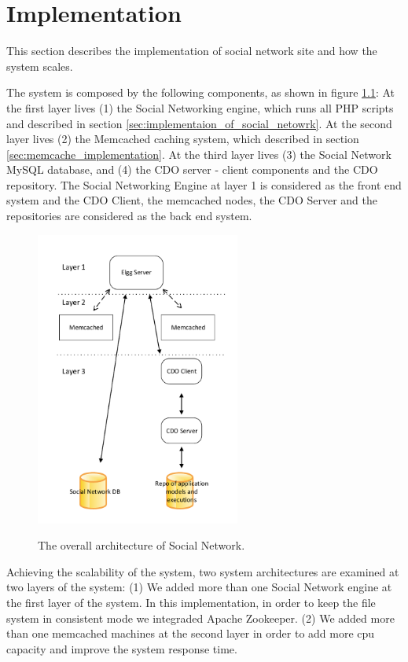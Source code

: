 
\chapter{Implementation}

This section describes the implementation of social network site
and how the system scales.

The system is composed by the following components, as shown in figure \ref{fig:system_architecture}: At the first layer lives (1) the Social Networking engine, which runs all PHP scripts and described in section \ref{sec:implementaion_of_social_netowrk}. At the second layer lives (2) the Memcached caching system, which described in section \ref{sec:memcache_implementation}. At the third layer lives (3) the Social Network MySQL database, and (4) the CDO server - client components and the CDO repository. The Social Networking Engine at layer 1 is considered as the front end system and the CDO Client, the memcached nodes, the CDO Server and the repositories are considered as the back end system. 

\begin{figure}[h]
	\caption{The overall architecture of Social Network.}
	\includegraphics[width=0.6\textwidth,natwidth=200,natheight=150]{./fig/system_architecture.pdf}
	\centering
	\label{fig:system_architecture}
\end{figure}

Achieving the scalability of the system, two system architectures are examined at two layers of the system: (1) We added more than one Social Network engine at the first layer of the system. In this implementation, in order to keep the file system in consistent mode we integraded Apache Zookeeper\cite{zookeeper_url}. (2) We added more than one memcached machines at the second layer in order to add more cpu capacity and improve the system response time.


